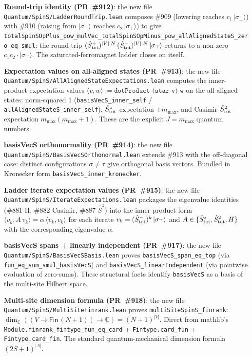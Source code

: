 \documentclass[a4paper,11pt]{article}
\begin{document}
\textbf{Round-trip identity (PR~\#912)}: the new file
\texttt{Quantum/SpinS/LadderRoundTrip.lean} composes \#909 (lowering
reaches $c_1\,|\sigma_\bot\rangle$) with \#910 (raising from
$|\sigma_\bot\rangle$ reaches $c_2\,|\sigma_\top\rangle$) to give
\texttt{totalSpinSOpPlus\_pow\_mulVec\_totalSpinSOpMinus\_pow\_allAlignedStateS\_zero\_eq\_smul}:
the round-trip $(\hat S^+_{\rm tot})^{|V|\cdot N}\,(\hat S^-_{\rm tot})^{|V|\cdot N}\,|\sigma_\top\rangle$
returns to a non-zero $c_1c_2\cdot|\sigma_\top\rangle$. The
saturated-ferromagnet ladder closes on itself.

\textbf{Expectation values on all-aligned states (PR~\#913)}: the new
file \texttt{Quantum/SpinS/AllAlignedStateExpectations.lean} computes
the inner-product expectation values
$\langle v, w\rangle := \texttt{dotProduct (star v) w}$ on the
all-aligned states: norm-squared 1
(\texttt{basisVecS\_inner\_self} / \texttt{allAlignedStateS\_inner\_self}),
$\hat S^z_{\rm tot}$ expectation $\pm m_{\max}$, and Casimir
$\hat S_{\rm tot}^2$ expectation $m_{\max}(m_{\max}+1)$. These are
the explicit $J = m_{\max}$ quantum numbers.

\textbf{basisVecS orthonormality (PR~\#914)}: the new file
\texttt{Quantum/SpinS/BasisVecSOrthonormal.lean} extends \#913 with
the off-diagonal case: distinct configurations $\sigma\neq\tau$
give orthogonal basis vectors. Bundled in Kronecker form
\texttt{basisVecS\_inner\_kronecker}.

\textbf{Ladder iterate expectation values (PR~\#915)}: the new file
\texttt{Quantum/SpinS/IterateExpectations.lean} packages the
eigenvalue identities (\#881 H, \#882 Casimir, \#887 $\hat S^z$)
into the inner-product form
$\langle v_k, A\,v_k\rangle = \alpha\,\langle v_k, v_k\rangle$ for
each iterate $v_k = (\hat S^-_{\rm tot})^k\,|\sigma_\top\rangle$ and
$A\in\{\hat S^z_{\rm tot}, \hat S_{\rm tot}^2, H\}$ with the
corresponding eigenvalue $\alpha$.

\textbf{basisVecS spans + linearly independent (PR~\#917)}: the new
file \texttt{Quantum/SpinS/BasisVecSBasis.lean} proves
\texttt{basisVecS\_span\_eq\_top} (via
\texttt{fun\_eq\_sum\_smul\_basisVecS}) and
\texttt{basisVecS\_linearIndependent} (via pointwise evaluation of
zero-sums). These structural facts identify
\texttt{basisVecS} as a basis of the multi-site Hilbert space.

\textbf{Multi-site dimension formula (PR~\#918)}: the new file
\texttt{Quantum/SpinS/MultiSiteFinrank.lean} proves
\texttt{multiSiteSpinS\_finrank}: $\dim_\mathbb{C} ((V \to
\textsf{Fin}\,(N+1)) \to \mathbb{C}) = (N+1)^{|V|}$. Direct from
mathlib's \texttt{Module.finrank\_fintype\_fun\_eq\_card} +
\texttt{Fintype.card\_fun} + \texttt{Fintype.card\_fin}. The
standard quantum-mechanical dimension formula $(2S+1)^{|\Lambda|}$.
\end{document}
